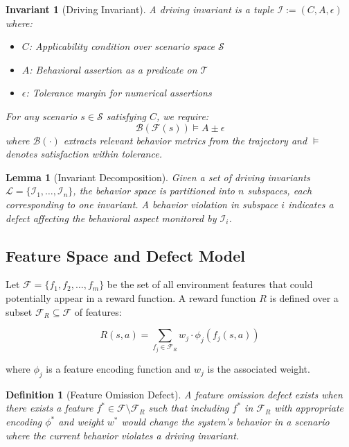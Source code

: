 \documentclass[conference]{IEEEtran}
\theoremstyle{plain}
\newtheorem{invariant}{Invariant}[section]
\newtheorem{definition}{Definition}[section]
\newtheorem{lemma}{Lemma}[section]
\newcommand{\invlib}{\mathcal{L}}
\newcommand{\scenario}{\mathcal{S}}
\newcommand{\traj}{\mathcal{T}}
\newcommand{\sys}{\mathcal{F}}
\newcommand{\beh}{\mathcal{B}}
\begin{document}
\begin{invariant}[Driving Invariant]\label{inv:definition}
A driving invariant is a tuple $\mathcal{I} := (C, A, \epsilon)$ where:
\begin{itemize}[nosep]
    \item $C$: Applicability condition over scenario space $\scenario$
    \item $A$: Behavioral assertion as a predicate on $\traj$
    \item $\epsilon$: Tolerance margin for numerical assertions
\end{itemize}
For any scenario $s \in \scenario$ satisfying $C$, we require:
\begin{equation}
\beh(\sys(s)) \models A \pm \epsilon
\label{eq:invariant}
\end{equation}
where $\beh(\cdot)$ extracts relevant behavior metrics from the trajectory and $\models$ denotes satisfaction within tolerance.
\end{invariant}

\begin{lemma}[Invariant Decomposition]\label{lem:decomposition}
Given a set of driving invariants $\invlib = \{\mathcal{I}_1, \ldots, \mathcal{I}_n\}$, the behavior space is partitioned into $n$ subspaces, each corresponding to one invariant. A behavior violation in subspace $i$ indicates a defect affecting the behavioral aspect monitored by $\mathcal{I}_i$.
\end{lemma}

\subsection{Feature Space and Defect Model}

Let $\mathcal{F} = \{f_1, f_2, \ldots, f_m\}$ be the set of all environment features that could potentially appear in a reward function. A reward function $R$ is defined over a subset $\mathcal{F}_R \subseteq \mathcal{F}$ of features:

\begin{equation}
R(s, a) = \sum_{f_j \in \mathcal{F}_R} w_j \cdot \phi_j(f_j(s, a))
\label{eq:reward}
\end{equation}

where $\phi_j$ is a feature encoding function and $w_j$ is the associated weight.

\begin{definition}[Feature Omission Defect]\label{def:defect}
A feature omission defect exists when there exists a feature $f^* \in \mathcal{F} \setminus \mathcal{F}_R$ such that including $f^*$ in $\mathcal{F}_R$ with appropriate encoding $\phi^*$ and weight $w^*$ would change the system's behavior in a scenario where the current behavior violates a driving invariant.
\end{definition}
\end{document}
